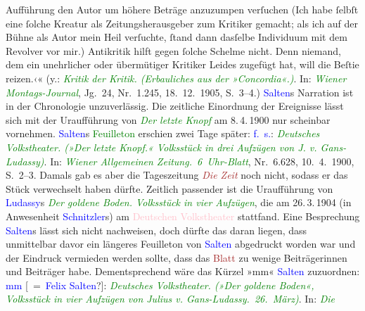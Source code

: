 {{{                        Aufführung den Autor um höhere Beträge anzuzumpen verſuchen (Ich habe ſelbſt
                        eine ſolche Kreatur als Zeitungsherausgeber zum Kritiker gemacht; als ich
                        auf der Bühne als Autor mein Heil verſuchte, ſtand dann dasſelbe Individuum
                        mit dem Revolver vor mir.) Antikritik hilft gegen ſolche Schelme nicht. Denn
                        niemand, dem ein unehrlicher oder übermütiger Kritiker Leides zugefügt hat,
                        will die Beſtie reizen.‹« (y.: \emph{\textcolor{green}{Kritik der Kritik. (Erbauliches aus der »Concordia«.)}}.
                     In: \emph{\textcolor{green}{Wiener Montags-Journal}}, Jg. 24,
                     Nr. 1.245, 18. 12. 1905, S. 3–4.) \textcolor{blue}{Salten}s Narration ist in der Chronologie
                  unzuverlässig. Die zeitliche Einordnung der Ereignisse lässt sich mit der
                  Uraufführung von \emph{\textcolor{green}{Der letzte Knopf}} am 8. 4. 1900 nur
                  scheinbar vornehmen. \textcolor{blue}{Salten}s \textcolor{green}{Feuilleton} erschien zwei Tage später: \textcolor{blue}{f. s.}: \emph{\textcolor{green}{Deutsches Volkstheater. (»Der letzte Knopf.« Volksstück in drei Aufzügen
                        von J. v. Gans-Ludassy)}}. In: \emph{\textcolor{green}{Wiener
                        Allgemeinen Zeitung. 6 Uhr-Blatt}}, Nr. 6.628, 10. 4. 1900, S. 2–3. Damals gab es aber die Tageszeitung \emph{\textcolor{brown}{Die Zeit}} noch nicht, sodass er das Stück
                  verwechselt haben dürfte. Zeitlich passender ist die Uraufführung von \textcolor{blue}{Ludassy}s \emph{\textcolor{green}{Der
                     goldene Boden. Volksstück in vier Aufzügen}}, die am 26. 3. 1904 (in
                  Anwesenheit \textcolor{blue}{Schnitzler}s) am \textcolor{pink}{Deutschen Volkstheater} stattfand. Eine Besprechung \textcolor{blue}{Salten}s lässt sich nicht nachweisen, doch
                  dürfte das daran liegen, dass unmittelbar davor ein längeres Feuilleton von \textcolor{blue}{Salten} abgedruckt worden war und der Eindruck
                  vermieden werden sollte, dass das \textcolor{brown}{Blatt} zu wenige Beiträgerinnen und Beiträger habe. Dementsprechend wäre
                  das Kürzel »mm« \textcolor{blue}{Salten} zuzuordnen: \textcolor{blue}{mm} [ = \textcolor{blue}{Felix Salten}?]: \emph{\textcolor{green}{Deutsches
                        Volkstheater. (»Der goldene Boden«, Volksstück in vier Aufzügen von Julius
                        v. Gans-Ludassy. 26. März)}}. In: \emph{\textcolor{green}{Die
}}}}}
